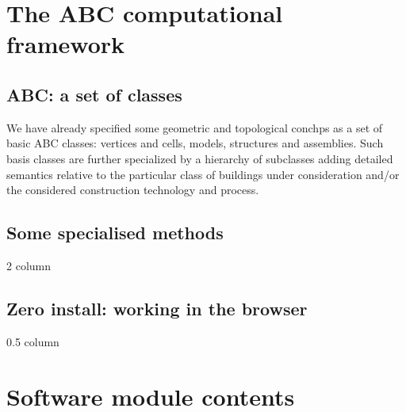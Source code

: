 \documentclass[11pt,oneside]{article}    %
\begin{document}
\section{The ABC computational framework}\label{sec:library}
\subsection{ABC: a set of classes}

We have already specified some geometric and topological conchps as a set of basic ABC classes: vertices and cells, models, structures and assemblies. Such basis classes are further specialized by a hierarchy of subclasses adding detailed semantics relative to the particular class of buildings under consideration and/or the considered construction technology and process.


\subsection{Some specialised methods}
2 column
\subsection{Zero install: working in the browser}
0.5 column

\section{Software module contents}\label{sec:library}
\end{document}
